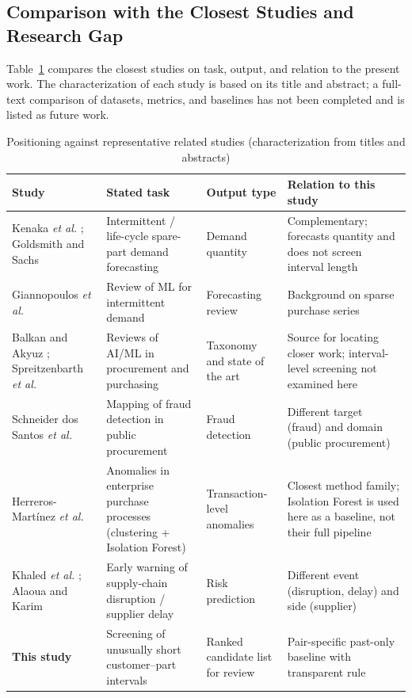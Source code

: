 \documentclass[conference]{IEEEtran}
\begin{document}
\subsection{Comparison with the Closest Studies and Research Gap}
Table~\ref{tab:related} compares the closest studies on task, output, and relation to the present work. The characterization of each study is based on its title and abstract; a full-text comparison of datasets, metrics, and baselines has not been completed and is listed as future work.

\begin{table}[t]
\caption{Positioning against representative related studies (characterization from titles and abstracts)}
\label{tab:related}
\centering
\footnotesize
\begin{tabular}{p{2.4cm}p{4.6cm}p{3.0cm}p{5.8cm}}
\toprule
\textbf{Study} & \textbf{Stated task} & \textbf{Output type} & \textbf{Relation to this study}\\
\midrule
Kenaka \textit{et al.} \cite{kenaka2025}; Goldsmith and Sachs \cite{goldsmith2025} & Intermittent / life-cycle spare-part demand forecasting & Demand quantity & Complementary; forecasts quantity and does not screen interval length\\
Giannopoulos \textit{et al.} \cite{giannopoulos2025} & Review of ML for intermittent demand & Forecasting review & Background on sparse purchase series\\
Balkan and Akyuz \cite{balkan2025}; Spreitzenbarth \textit{et al.} \cite{spreitzenbarth2024} & Reviews of AI/ML in procurement and purchasing & Taxonomy and state of the art & Source for locating closer work; interval-level screening not examined here\\
Schneider dos Santos \textit{et al.} \cite{schneider2025} & Mapping of fraud detection in public procurement & Fraud detection & Different target (fraud) and domain (public procurement)\\
Herreros-Mart\'inez \textit{et al.} \cite{herreros2025} & Anomalies in enterprise purchase processes (clustering + Isolation Forest) & Transaction-level anomalies & Closest method family; Isolation Forest is used here as a baseline, not their full pipeline\\
Khaled \textit{et al.} \cite{khaled2024}; Alaoua and Karim \cite{alaoua2025} & Early warning of supply-chain disruption / supplier delay & Risk prediction & Different event (disruption, delay) and side (supplier)\\
\textbf{This study} & Screening of unusually short customer--part intervals & Ranked candidate list for review & Pair-specific past-only baseline with transparent rule\\
\bottomrule
\end{tabular}
\end{table}
\end{document}
